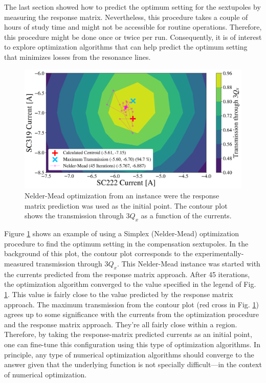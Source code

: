 The last section showed how to predict the optimum setting for the sextupoles by measuring the response matrix. Nevertheless, this procedure takes a couple of hours of study time and might not be accessible for routine operations. Therefore, this procedure might be done once or twice per run. Consequently, it is of interest to explore optimization algorithms that can help predict the optimum setting that minimizes losses from the resonance lines.   

\begin{figure}[H]
    \centering
    \includegraphics[width=\columnwidth]{chapter4/nelder_mead.png}
    \caption{Nelder-Mead optimization from an instance were the response matrix prediction was used as the initial point. The contour plot shows the transmission through $3Q_x$ as a function of the currents.}
    \label{fig:neldermead}
\end{figure}

Figure \ref{fig:neldermead} shows an example of using a Simplex (Nelder-Mead) optimization procedure to find the optimum setting in the compensation sextupoles. In the background of this plot, the contour plot corresponds to the experimentally-measured transmission through $3Q_x$. This Nelder-Mead instance was started with the currents predicted from the response matrix approach. After 45 iterations, the optimization algorithm converged to the value specified in the legend of Fig. \ref{fig:neldermead}. This value is fairly close to the value predicted by the response matrix approach. The maximum transmission from the contour plot (red cross in Fig. \ref{fig:neldermead}) agrees up to some significance with the currents from the optimization procedure and the response matrix approach. They're all fairly close within a region. Therefore, by taking the response-matrix predicted currents as an initial point, one can fine-tune this configuration using this type of optimization algorithms. In principle, any type of numerical optimization algorithms should converge to the answer given that the underlying function is not specially difficult---in the context of numerical optimization. 

